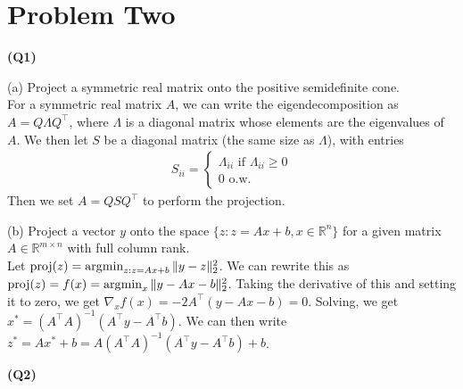 

\section*{Problem Two}

\textbf{(Q1)}

(a) Project a symmetric real matrix onto the positive semidefinite cone.\\
For a symmetric real matrix $A$, we can write the eigendecomposition as
$A = Q \Lambda Q^\top$, where $\Lambda$ is a diagonal matrix whose elements
are the eigenvalues of $A$. We then let $S$ be a diagonal matrix (the same 
size as $\Lambda$), with entries 
\begin{align*}
    S_{ii} = \begin{cases} \Lambda_{ii} \text{ if } \Lambda_{ii}\geq 0 \\ 0 \text{ o.w. } \end{cases}
\end{align*}
Then we set $A = Q S Q^\top$ to perform the projection.

(b) Project a vector $y$ onto the space $\{z : z = Ax+b, x\in \mathbb{R}^n\}$
for a given matrix $A \in \mathbb{R}^{m \times n}$ with full column rank.\\ Let
$\text{proj}(z) = \operatorname*{\arg\!\min}_{z:z=Ax+b} \|y-z\|_2^2$. We can rewrite this as
$\text{proj}(z) = f(x) = \operatorname*{\arg\!\min}_{x} \|y-Ax-b\|_2^2$. Taking the derivative of
this and setting it to zero, we get $\nabla_x f(x) = -2A^\top(y-Ax-b)=0$.
Solving, we get $x^* = (A^\top A)^{-1}(A^\top y - A^\top b)$. We can then write 
$z^*  = A x^* + b =  A(A^\top A)^{-1}(A^\top y - A^\top b) + b$.


\textbf{(Q2)}

